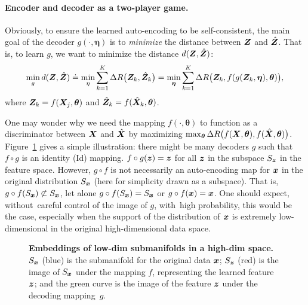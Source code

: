 \documentclass[\toplevelprefix/book-main.tex]{subfiles}
\begin{document}
\paragraph{Encoder and decoder as a two-player game.}
Obviously, to ensure the learned auto-encoding to be self-consistent,  the main goal of the decoder $g(\cdot, \bm \eta)$ is to {\em minimize} the distance between $\bm{Z}$ and $\hat {\bm{Z}}$. That is, to learn $g$, we want to minimize the distance $d(\bm{Z}, \hat {\bm{Z}})$:
\begin{equation}
\min_g d(\bm{Z}, \hat {\bm{Z}}) \doteq \min_\eta  \sum_{k=1}^K \Delta R\big(\bm{Z}_k, \hat{\bm{Z}}_k\big) =  \min_{\bm \eta}  \sum_{k=1}^K \Delta R\big(\bm{Z}_k, f(g(\bm{Z}_k, \bm \eta),\bm \theta)\big),
\label{eqn:min-distance}
\end{equation}
where $\bm{Z}_k = f(\bm{X}_j,\bm \theta)$ and $\hat {\bm{Z}}_k = f(\hat{\bm{X}}_k,\bm\theta)$. 

\begin{example}
One may wonder why we need the mapping $f(\cdot, \bm \theta)$ to function as a discriminator between $\bm{X}$ and $\hat {\bm{X}}$ by maximizing $\max_{\bm \theta} \Delta R\big(f(\bm{X},\bm \theta), f(\hat {\bm{X}}, \bm \theta)\big)$. Figure~\ref{fig:decoder} gives a simple illustration: there might be many decoders $g$ such that $f\circ g$ is an identity (Id) mapping. $f\circ g(\bm{z}) = \bm{z} $ for all $\bm{z}$ in the subspace $S_{\bm{z}}$ in the feature space. However, $g\circ f$ is not necessarily an auto-encoding map for $\bm{x}$ in the original distribution $S_{\bm{x}}$ (here for simplicity drawn as a subspace). That is, $g\circ f(S_{\bm{x}}) \not\subset S_{\bm{x}}$, let alone $g\circ f(S_{\bm{x}}) = S_{\bm{x}}$ or $g\circ f(\bm{x}) = \bm{x}$. One should expect, without~careful control of the image of $g$, with~high probability, this would be the case, especially when the support of the distribution of $\bm{x}$ is extremely  low-dimensional in the original high-dimensional data space. 
\end{example}
\begin{figure}
\caption{\textbf{{Embeddings} %
 of low-dim submanifolds in a high-dim space.} $S_{\bm{x}}$ (blue) is the submanifold for the original data $\bm{x}$; $S_{\bm{z}}$ (red) is the image of $S_{\bm{x}}$ under the mapping $f$, representing the learned feature $\bm{z}$; and the green curve  is the image of the feature $\bm{z}$ under the decoding \mbox{mapping $g$.} } \label{fig:decoder}
\end{figure} 
\end{document}
